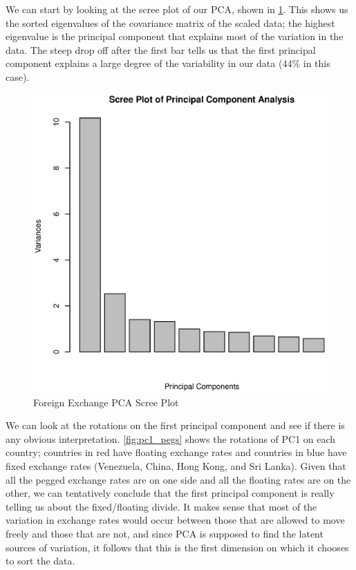 \documentclass[11pt, fleqn]{article}
\begin{document}
We can start by looking at the scree plot of our PCA, shown in \cref{fig:screeplot}. This shows us the sorted eigenvalues of the covariance matrix of the scaled data; the highest eigenvalue is the principal component that explains most of the variation in the data. The steep drop off after the first bar tells us that the first principal component explains a large degree of the variability in our data  (44\% in this case).

\begin{figure}[!htb]
  \centering
  \includegraphics[scale=.5]{screeplot.eps}
  \caption{Foreign Exchange PCA Scree Plot}
  \label{fig:screeplot}
\end{figure} 

We can look at the rotations on the first principal component and see if there is any obvious interpretation. \cref{fig:pc1_pegs} shows the rotations of PC1 on each country; countries in red have floating exchange rates and countries in blue have fixed exchange rates (Venezuela, China, Hong Kong, and Sri Lanka). Given that all the pegged exchange rates are on one side and all the floating rates are on the other, we can tentatively conclude that the first principal component is really telling us about the fixed/floating divide. It makes sense that most of the variation in exchange rates would occur between those that are allowed to move freely and those that are not, and since PCA is supposed to find the latent sources of variation, it follows that this is the first dimension on which it chooses to sort the data.
\end{document}

